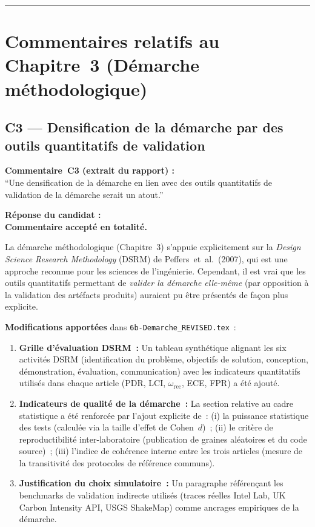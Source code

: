 \documentclass[12pt,a4paper]{article}
\newcommand{\Commentaire}[2]{%
  \begin{reviewerbox}
    \textbf{Commentaire~#1 (extrait du rapport) :}\\#2
  \end{reviewerbox}%
}
\newcommand{\Reponse}[1]{%
  \begin{responsebox}
    \textbf{Réponse du candidat :}\\#1
  \end{responsebox}%
}
\begin{document}
\bigskip
\hrule
\bigskip

\section*{Commentaires relatifs au Chapitre~3 (Démarche méthodologique)}

\subsection*{C3 --- Densification de la démarche par des outils quantitatifs de validation}

\Commentaire{C3}{
  ``Une densification de la démarche en lien avec des outils quantitatifs de validation de la
  démarche serait un atout.''
}

\Reponse{
\textbf{Commentaire accepté en totalité.}

La démarche méthodologique (Chapitre~3) s'appuie explicitement sur la \emph{Design Science Research Methodology} (DSRM) de Peffers~et~al.\ (2007), qui est une approche reconnue pour les sciences de l'ingénierie. Cependant, il est vrai que les outils quantitatifs permettant de \emph{valider la démarche elle-même} (par opposition à la validation des artéfacts produits) auraient pu être présentés de façon plus explicite.

\textbf{Modifications apportées} dans \texttt{6b-Demarche\_REVISED.tex}~:
\begin{enumerate}[leftmargin=*]
  \item \textbf{Grille d'évaluation DSRM~:} Un tableau synthétique alignant les six activités DSRM (identification du problème, objectifs de solution, conception, démonstration, évaluation, communication) avec les indicateurs quantitatifs utilisés dans chaque article (PDR, LCI, $\omega_{\text{rec}}$, ECE, FPR) a été ajouté.
  \item \textbf{Indicateurs de qualité de la démarche~:} La section relative au cadre statistique a été renforcée par l'ajout explicite de~: (i) la puissance statistique des tests (calculée via la taille d'effet de Cohen~$d$)~; (ii) le critère de reproductibilité inter-laboratoire (publication de graines aléatoires et du code source)~; (iii) l'indice de cohérence interne entre les trois articles (mesure de la transitivité des protocoles de référence communs).
  \item \textbf{Justification du choix simulatoire~:} Un paragraphe référençant les benchmarks de validation indirecte utilisés (traces réelles Intel Lab, UK Carbon Intensity API, USGS ShakeMap) comme ancrages empiriques de la démarche.
\end{enumerate}
}
\end{document}
